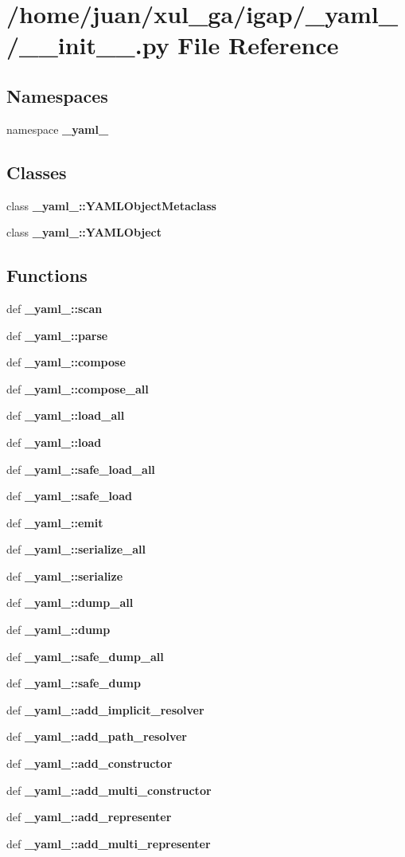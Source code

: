 \section{/home/juan/xul\_\-ga/igap/\_\-yaml\_\-/\_\-\_\-init\_\-\_\-.py File Reference}
\label{__yaml___2____init_____8py}
\subsection*{Namespaces}
\begin{CompactItemize}
\item 
namespace {\bf \_\-yaml\_\-}
\end{CompactItemize}
\subsection*{Classes}
\begin{CompactItemize}
\item 
class {\bf \_\-yaml\_\-::YAMLObjectMetaclass}
\item 
class {\bf \_\-yaml\_\-::YAMLObject}
\end{CompactItemize}
\subsection*{Functions}
\begin{CompactItemize}
\item 
def {\bf \_\-yaml\_\-::scan}
\item 
def {\bf \_\-yaml\_\-::parse}
\item 
def {\bf \_\-yaml\_\-::compose}
\item 
def {\bf \_\-yaml\_\-::compose\_\-all}
\item 
def {\bf \_\-yaml\_\-::load\_\-all}
\item 
def {\bf \_\-yaml\_\-::load}
\item 
def {\bf \_\-yaml\_\-::safe\_\-load\_\-all}
\item 
def {\bf \_\-yaml\_\-::safe\_\-load}
\item 
def {\bf \_\-yaml\_\-::emit}
\item 
def {\bf \_\-yaml\_\-::serialize\_\-all}
\item 
def {\bf \_\-yaml\_\-::serialize}
\item 
def {\bf \_\-yaml\_\-::dump\_\-all}
\item 
def {\bf \_\-yaml\_\-::dump}
\item 
def {\bf \_\-yaml\_\-::safe\_\-dump\_\-all}
\item 
def {\bf \_\-yaml\_\-::safe\_\-dump}
\item 
def {\bf \_\-yaml\_\-::add\_\-implicit\_\-resolver}
\item 
def {\bf \_\-yaml\_\-::add\_\-path\_\-resolver}
\item 
def {\bf \_\-yaml\_\-::add\_\-constructor}
\item 
def {\bf \_\-yaml\_\-::add\_\-multi\_\-constructor}
\item 
def {\bf \_\-yaml\_\-::add\_\-representer}
\item 
def {\bf \_\-yaml\_\-::add\_\-multi\_\-representer}
\end{CompactItemize}
